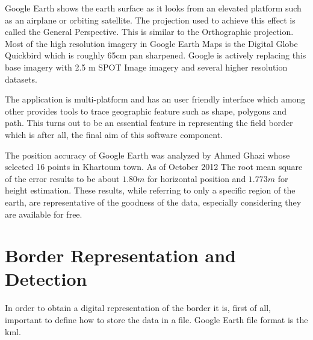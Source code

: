 Google Earth shows the earth surface as it looks from an elevated platform such as an airplane or orbiting satellite. The projection used to achieve this effect is called the General Perspective. This is similar to the Orthographic projection. Most of the high resolution imagery in Google Earth Maps is the Digital Globe Quickbird which is roughly 65cm pan sharpened. Google is actively replacing this base imagery with 2.5 m SPOT Image imagery and several higher resolution datasets.\par
The application is multi-platform and has an user friendly interface which among other provides tools to trace geographic feature such as shape, polygons and path. This turns out to be an essential feature in representing the field border which is after all, the final aim of this software component.\par
The position accuracy of Google Earth was analyzed by Ahmed Ghazi whose selected 16 points in Khartoum
town. As of October 2012 The root mean square of the error results to be about $1.80m$ for horizontal position and $1.773m$ for height estimation.\cite{PosAccuracyGE} These results, while referring to only a specific region of the earth, are representative of the goodness of the data, especially considering they are available for free.\\

\section{Border Representation and Detection} %
\label{sec:border_detection_and_representation}
In order to obtain a digital representation of the border it is, first of all, important to define how to store the data in a file. Google Earth file format is the \acrfull{kml}.

